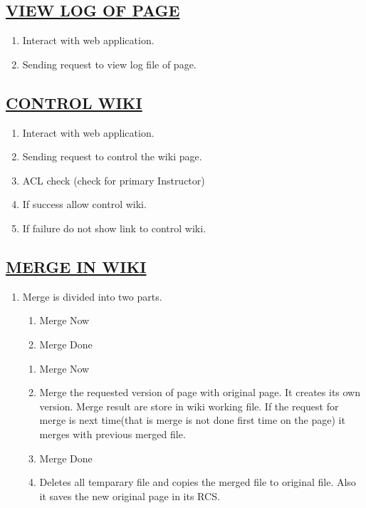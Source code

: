 \documentclass{article}
\begin{document}
\subsection*{\underline{VIEW LOG OF PAGE}}
\begin{enumerate}
\item Interact with web application.
\item Sending request to view log file of page.
\begin{center}

\end{center}
\end{enumerate}
\subsection*{\underline{CONTROL WIKI}}
\begin{enumerate}
\item Interact with web application.
\item Sending request to control the wiki page.
\item ACL check (check for primary Instructor)
\item If success allow control wiki.
\item If failure do not show link to control wiki.
\begin{center}

\end{center}
\end{enumerate}
\subsection*{\underline{MERGE IN WIKI}}
\begin{enumerate}
\item[{}{}]
 Merge is divided into two parts.
\begin{enumerate}
\item  Merge Now
\item  Merge Done
\end{enumerate}
\begin{enumerate}
\item{Merge Now}
\item[{}{}]
Merge the requested version of page with original page. It creates its own version. Merge result are store in wiki working file.
If the request for merge is next time(that is merge is not done first time on  the page) it merges with previous merged file. 
\item{Merge Done}
\item[{}{}]
Deletes all temparary file and copies the merged file to original file. Also it saves the new original page in its RCS.
\end{enumerate}
\end{enumerate}
\end{document}
